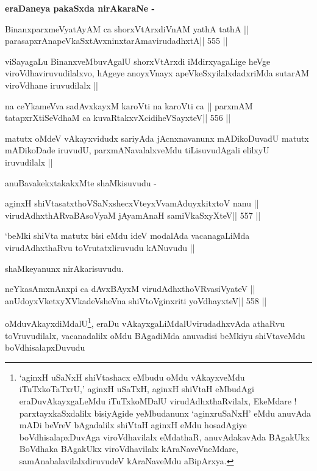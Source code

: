 \medskip
\centerline{\textbf{eraDaneya pakaSxda nirAkaraNe -}}

\begin{shl}
BinanxparxmeVyatAyAM ca shorxVtArxdiVnAM yathA tathA ||
parasapxrAnapeVkaSxtAvxninxtarAmavirudadhxtA\hfill || 555 ||
\end{shl}

\begin{artha}
viSayagaLu BinanxveMbuvAgalU shorxVtArxdi iMdirxyagaLige heVge
viroVdhaviruvudilalxvo, hAgeye anoyxVnayx apeVkeSxyilalxdadxriMda
sutarAM viroVdhane iruvudilalx ||
\end{artha}

\begin{shl}
na ceYkameVva sadAvxkayxM karoVti na karoVti ca ||
parxmAM tatapxrXtiSeVdhaM ca kuvaRtakxvXcidiheVSayxteV\hfill || 556 ||
\end{shl}

\begin{artha}
matutx oMdeV vAkayxvidudx sariyAda jAcnxnavanunx mADikoDuvadU matutx
mADikoDade iruvudU, parxmANavalalxveMdu tiLisuvudAgali elilxyU
iruvudilalx ||

anuBavakekxtakakxMte shaMkisuvudu -
\end{artha}

\begin{shl}
aginxH shiVtasatxthoVSaNxshecxVteyxVvamAduyxkitxtoV nanu ||
virudAdhxthARvaBAsoV\s yaM jAyamAnaH samiVkaSxyXteV\hfill || 557 ||
\end{shl}

\begin{artha}
`beMki shiVta matutx bisi eMdu ideV modalAda vacanagaLiMda
  virudAdhxthaRvu toVrutatxliruvudu kANuvudu ||

shaMkeyanunx nirAkarisuvudu.
\end{artha}

\begin{shl}
neYkasAmxnAnxpi ca dAvxBAyxM virudAdhxthoVR\s vasiVyateV ||
anUdoyxVketxyXVkadeVsheVna shiVtoV\s ginxriti yoVdhayxteV\hfill || 558 ||
\end{shl}

\begin{artha}
oMduvAkayxdiMdalU\footnote[1]{`aginxH uSaNxH shiVtashacx eMbudu oMdu
  vAkayxveMdu iTuTxkoTaTxrU,' aginxH uSaTxH, aginxH shiVtaH eMbudAgi
  eraDuvAkayxgaLeMdu iTuTxkoMDalU virudAdhxthaRvilalx, EkeMdare !
  parxtayxkaSxdalilx bisiyAgide yeMbudanunx `aginxruSaNxH' eMdu
  anuvAda mADi beVreV bAgadalilx shiVtaH aginxH eMdu hosadAgiye
  boVdhisalapxDuvAga viroVdhavilalx eMdathaR, anuvAdakavAda BAgakUkx
  BoVdhaka BAgakUkx viroVdhavilalx kAraNaveVneMdare,
  samAnabalavilalxdiruvudeV kAraNaveMdu aBipArxya.}, eraDu vAkayxgaLiMdalU\footnotemark[1]
virudadhxvAda athaRvu toVruvudilalx, vacanadalilx oMdu BAgadiMda
anuvadisi beMkiyu shiVtaveMdu boVdhisalapxDuvudu
\end{artha}

